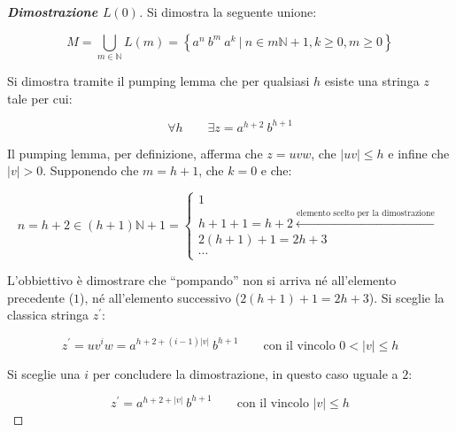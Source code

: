 \documentclass[a4paper]{article}
\newcommand{\dquotes}[1]{``#1''}
\begin{document}
	\begin{proof}[\textbf{Dimostrazione $L\left(0\right)$}]
		Si dimostra la seguente unione:
		
		\begin{equation*}
			M = \bigcup_{m\in\mathbb{N}} L\left(m\right) = \left\{a^{n} \: b^{m} \: a^{k} \: \left| \: n \in m\mathbb{N} + 1, k \ge 0, m \ge 0 \right.\right\}
		\end{equation*}
	
		\noindent
		Si dimostra tramite il pumping lemma che per qualsiasi $h$ esiste una stringa $z$ tale per cui:
		
		\begin{equation*}
			\forall h \hspace{2em} \exists z = a^{h + 2} \: b^{h + 1}
		\end{equation*}
	
		\noindent
		Il pumping lemma, per definizione, afferma che $z = uvw$, che $|uv| \le h$ e infine che $|v| > 0$. Supponendo che $m = h + 1$, che $k = 0$ e che:
		
		\begin{equation*}
			n = h + 2 \in \left(h + 1\right) \mathbb{N} + 1 = 
			\begin{cases}
				1 \\
				h + 1 + 1 = h + 2 \xleftarrow{\text{elemento scelto per la dimostrazione}} \\
				2\left(h + 1\right) + 1 = 2h + 3 \\
				\cdots
			\end{cases}
		\end{equation*}
	
		\noindent
		L'obbiettivo è dimostrare che \dquotes{pompando} non si arriva né all'elemento precedente ($1$), né all'elemento successivo ($2\left(h + 1\right) + 1 = 2h + 3$). Si sceglie la classica stringa $z^{'}$:
		
		\begin{equation*}
			z^{'} = u v^{i} w = a^{h + 2 +\left(i - 1\right) |v|}  \: b^{h + 1} \hspace{2em} \text{con il vincolo } 0 < |v| \le h
 		\end{equation*}
	
		\noindent
		Si sceglie una $i$ per concludere la dimostrazione, in questo caso uguale a $2$:
		
		\begin{equation*}
			z^{'} = a^{h + 2 + |v|} \: b^{h + 1} \hspace{2em} \text{con il vincolo } |v| \le h 
		\end{equation*}
		

\end{proof}
\end{document}
